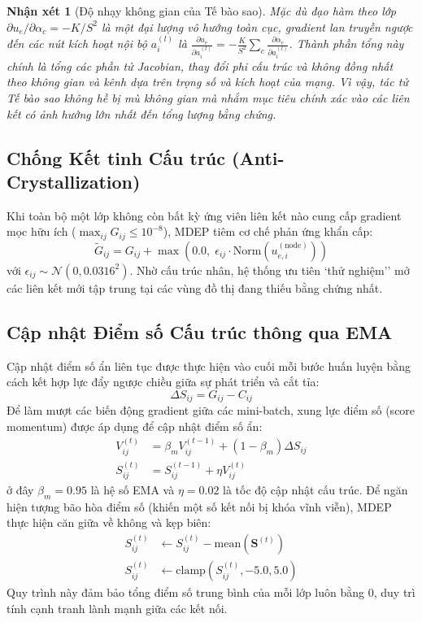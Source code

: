\documentclass[11pt, a4paper]{article}
\newcommand{\Norm}{\text{Norm}}
\newtheorem{remark}{Nhận xét}
\begin{document}
\begin{remark}[Độ nhạy không gian của Tế bào sao]
Mặc dù đạo hàm theo lớp $\partial u_e / \partial \alpha_c = -K/S^2$ là một đại lượng vô hướng toàn cục, gradient lan truyền ngược đến các nút kích hoạt nội bộ $a_i^{(l)}$ là $\frac{\partial u_e}{\partial a_i^{(l)}} = -\frac{K}{S^2} \sum_c \frac{\partial \alpha_c}{\partial a_i^{(l)}}$. Thành phần tổng này chính là tổng các phần tử Jacobian, thay đổi phi cấu trúc và không đồng nhất theo không gian và kênh dựa trên trọng số và kích hoạt của mạng. Vì vậy, tác tử Tế bào sao không hề bị mù không gian mà nhắm mục tiêu chính xác vào các liên kết có ảnh hưởng lớn nhất đến tổng lượng bằng chứng.
\end{remark}

\subsection{Chống Kết tinh Cấu trúc (Anti-Crystallization)}\label{subsec:anti_crystal}

Khi toàn bộ một lớp không còn bất kỳ ứng viên liên kết nào cung cấp gradient mọc hữu ích ($\max_{ij} G_{ij} \le 10^{-8}$), MDEP tiêm cơ chế phản ứng khẩn cấp:
\begin{equation}\label{eq:anti_crystal}
    \tilde{G}_{ij} = G_{ij} + \max\!\left(0.0,\; \epsilon_{ij} \cdot \Norm(u_{e,i}^{(\text{node})})\right)
\end{equation}
với $\epsilon_{ij} \sim \mathcal{N}(0, 0.0316^2)$. Nhờ cấu trúc nhân, hệ thống ưu tiên `thử nghiệm'' mở các liên kết mới tập trung tại các vùng đồ thị đang thiếu bằng chứng nhất.

\subsection{Cập nhật Điểm số Cấu trúc thông qua EMA}\label{subsec:score_update}

Cập nhật điểm số ẩn liên tục được thực hiện vào cuối mỗi bước huấn luyện bằng cách kết hợp lực đẩy ngược chiều giữa sự phát triển và cắt tỉa:
\begin{equation}\label{eq:delta_S}
    \Delta S_{ij} = G_{ij} - C_{ij}
\end{equation}
Để làm mượt các biến động gradient giữa các mini-batch, xung lực điểm số (score momentum) được áp dụng để cập nhật điểm số ẩn:
\begin{align}
    V_{ij}^{(t)} &= \beta_m V_{ij}^{(t-1)} + (1 - \beta_m) \Delta S_{ij} \\
    S_{ij}^{(t)} &= S_{ij}^{(t-1)} + \eta V_{ij}^{(t)}
\end{align}
ở đây $\beta_m = 0.95$ là hệ số EMA và $\eta = 0.02$ là tốc độ cập nhật cấu trúc. Để ngăn hiện tượng bão hòa điểm số (khiến một số kết nối bị khóa vĩnh viễn), MDEP thực hiện căn giữa về không và kẹp biên:
\begin{align}
    S_{ij}^{(t)} &\leftarrow S_{ij}^{(t)} - \text{mean}(\bm{S}^{(t)}) \\
    S_{ij}^{(t)} &\leftarrow \text{clamp}(S_{ij}^{(t)}, -5.0, 5.0)
\end{align}
Quy trình này đảm bảo tổng điểm số trung bình của mỗi lớp luôn bằng 0, duy trì tính cạnh tranh lành mạnh giữa các kết nối.
\end{document}
